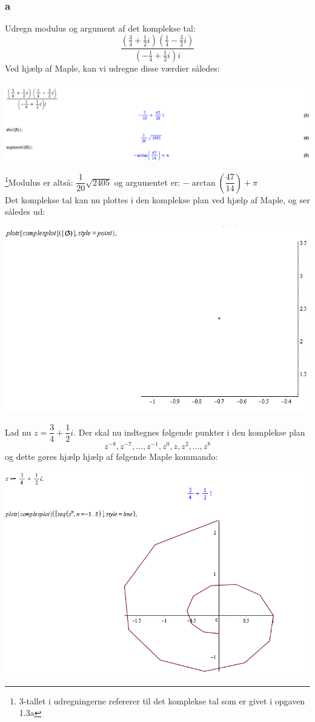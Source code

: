 \documentclass[12pt]{article}
\begin{document}
\subsubsection*{a}
Udregn modulus og argument af det komplekse tal:
$$\frac{(\frac{3}{4}+\frac{1}{2}i)(\frac{1}{4}-\frac{3}{2}i)}{(-\frac{1}{4}+\frac{1}{2}i)i}$$
Ved hjælp af Maple, kan vi udregne disse værdier således:
\begin{center}
\includegraphics[scale=0.6]{3.png}
\end{center}
\footnote{3-tallet i udregningerne refererer til det komplekse tal som er givet i opgaven 1.3a}Modulus er altså: $\dfrac{1}{20}\sqrt{2405}$ og argumentet er: $-\arctan(\dfrac{47}{14})+\pi$\\
Det komplekse tal kan nu plottes i den komplekse plan ved hjælp af Maple, og ser således ud:
\begin{center}
\includegraphics[scale=0.6]{4.png}
\end{center}
Lad nu $z=\dfrac{3}{4}+\dfrac{1}{2}i$. Der skal nu indtegnes følgende punkter i den komplekse plan
$$z^{-8},z^{-7},\ldots, z^{-1},z^{0},z,z^2,\ldots,z^8 $$
og dette gøres hjælp hjælp af følgende Maple kommando:
\begin{center}
\includegraphics[scale=0.6]{5.png}
\end{center}
\end{document}
